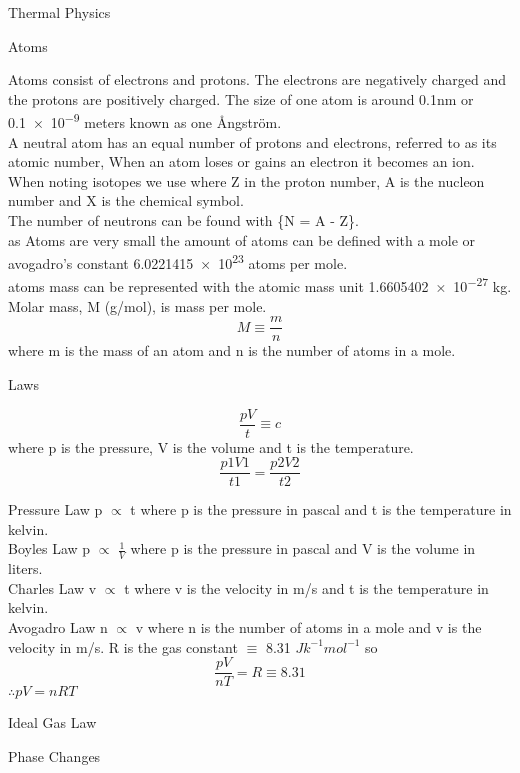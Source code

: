 \documentclass{article}
\newcommand\hr{\par\vspace{-.5\ht\strutbox}\noindent\hrulefill\par}
\newcommand\br{\vspace{0.5cm}}
\begin{document}
\Huge \raggedright Thermal Physics \\ \vspace{1cm}
    \hr
    \LARGE \center Atoms \\
    \br
    
    \raggedright
    \large Atoms consist of electrons and protons. The electrons are negatively charged and the protons are positively charged. The size of one atom is around 0.1nm or \num{0.1e-9} meters known as one Ångström. \\
    \large A neutral atom has an equal number of protons and electrons, referred to as its atomic number, When an atom loses or gains an electron it becomes an ion. When noting isotopes we use  where Z in the proton number, A is the nucleon number and X is the chemical symbol. \\ 
    \large The number of neutrons can be found with \{N = A - Z\}. \\ 
    \large as Atoms are very small the amount of atoms can be defined with a mole or avogadro's constant \num{6.0221415e23} atoms per mole. \\
    \large atoms mass can be represented with the atomic mass unit \num{1.6605402e-27} kg. \\
    \large Molar mass, M (g/mol), is mass per mole. \[M \equiv \frac{m}{n}\] where m is the mass of an atom and n is the number of atoms in a mole. \\




    \hr
    \LARGE \center Laws \\
    \begin{large}
    \[ \frac{pV}{t} \equiv c\] where p is the pressure, V is the volume and t is the temperature. 
    \[\frac{p1V1}{t1} = \frac{p2V2}{t2}\]
    \raggedright
    Pressure Law p $\propto$ t where p is the pressure in pascal and t is the temperature in kelvin. \\
    Boyles Law p $\propto$ $\frac{1}{V}$ where p is the pressure in pascal and V is the volume in liters. \\
    Charles Law v $\propto$ t where v is the velocity in m/s and t is the temperature in kelvin. \\
    Avogadro Law n $\propto$ v where n is the number of atoms in a mole and v is the velocity in m/s. R is the gas constant $\equiv$ 8.31 $Jk^{-1} mol^{-1}$ so \[\frac{pV}{nT} = R \equiv 8.31\] $\therefore pV=nRT$ 
    \end{large}


    \hr
    \LARGE \center Ideal Gas Law \\
    \br
    \raggedright



    \hr
    \LARGE \center Phase Changes \\
    \br
    \raggedright

    \hr
\end{document}
